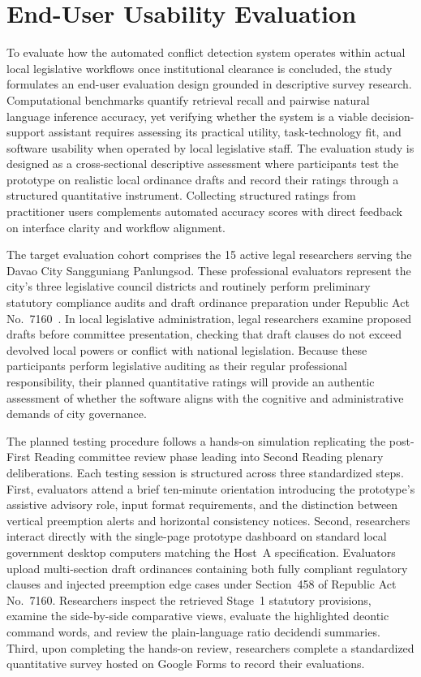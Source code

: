     \section{End-User Usability Evaluation}
    \label{sec:user_evaluation_study}
    To evaluate how the automated conflict detection system operates within actual local legislative workflows once institutional clearance is concluded, the study formulates an end-user evaluation design grounded in descriptive survey research. Computational benchmarks quantify retrieval recall and pairwise natural language inference accuracy, yet verifying whether the system is a viable decision-support assistant requires assessing its practical utility, task-technology fit, and software usability when operated by local legislative staff. The evaluation study is designed as a cross-sectional descriptive assessment where participants test the prototype on realistic local ordinance drafts and record their ratings through a structured quantitative instrument. Collecting structured ratings from practitioner users complements automated accuracy scores with direct feedback on interface clarity and workflow alignment.

    The target evaluation cohort comprises the 15 active legal researchers serving the Davao City Sangguniang Panlungsod. These professional evaluators represent the city's three legislative council districts and routinely perform preliminary statutory compliance audits and draft ordinance preparation under Republic Act No.~7160~\cite{philgov1991ra7160}. In local legislative administration, legal researchers examine proposed drafts before committee presentation, checking that draft clauses do not exceed devolved local powers or conflict with national legislation. Because these participants perform legislative auditing as their regular professional responsibility, their planned quantitative ratings will provide an authentic assessment of whether the software aligns with the cognitive and administrative demands of city governance.

    The planned testing procedure follows a hands-on simulation replicating the post-First Reading committee review phase leading into Second Reading plenary deliberations. Each testing session is structured across three standardized steps. First, evaluators attend a brief ten-minute orientation introducing the prototype's assistive advisory role, input format requirements, and the distinction between vertical preemption alerts and horizontal consistency notices. Second, researchers interact directly with the single-page prototype dashboard on standard local government desktop computers matching the Host~A specification. Evaluators upload multi-section draft ordinances containing both fully compliant regulatory clauses and injected preemption edge cases under Section~458 of Republic Act No.~7160. Researchers inspect the retrieved Stage~1 statutory provisions, examine the side-by-side comparative views, evaluate the highlighted deontic command words, and review the plain-language ratio decidendi summaries. Third, upon completing the hands-on review, researchers complete a standardized quantitative survey hosted on Google Forms to record their evaluations.

